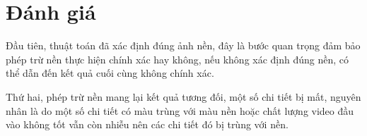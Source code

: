\documentclass[a4paper]{article}
\begin{document}
\newpage
\section{Đánh giá}
Đầu tiên, thuật toán đã xác định đúng ảnh nền, đây là bước quan trọng đảm bảo phép trừ nền thực hiện chính xác hay không, nếu không xác định đúng nền, có thể dẫn đến kết quả cuối cùng không chính xác.

Thứ hai, phép trừ nền mang lại kết quả tương đối, một số chi tiết bị mất, nguyên nhân là do một số chi tiết có màu trùng với màu nền hoặc chất lượng video đầu vào không tốt vẫn còn nhiễu nên các chi tiết đó bị trùng với nền.
\end{document}
